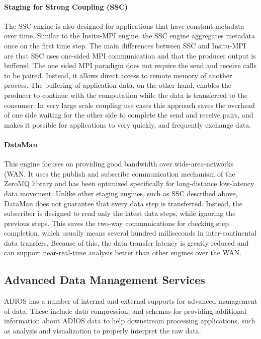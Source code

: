 \paragraph{\textbf{Staging for Strong Coupling (SSC)}}
The SSC engine is also designed for applications that have constant metadata over time. Similar to the Insitu-MPI engine, the SSC engine aggregates metadata once on the first time step. The main differences between SSC and Insitu-MPI are that SSC uses one-sided MPI communication and that the producer output is buffered.
The one sided MPI paradigm does not require the send and receive calls to be paired. Instead, it allows direct access to remote memory of another process. The buffering of application data, on the other hand, enables the producer to continue with the computation while the data is transferred to the consumer. 
In very large scale coupling use cases this approach saves the overhead of one side waiting for the other side to complete the send and receive pairs, and makes it possible for applications to very quickly, and frequently exchange data. 


\paragraph{\textbf{DataMan}}
This engine focuses on providing good bandwidth over wide-area-networks (WAN. It uses the publish and subscribe communication mechanism of the ZeroMQ library and has been optimized specifically for long-distance low-latency data movement. Unlike other staging engines, such as SSC described above, DataMan does not guarantee that every data step is transferred. Instead, the subscriber is designed to read only the latest data steps, while ignoring the previous steps. This saves the two-way communications for checking step completion, which usually means several hundred milliseconds in inter-continental data transfers. Because of this, the data transfer latency is greatly reduced and can support near-real-time analysis better than other engines over the WAN.

\subsection{Advanced Data Management Services}
\label{sec:adios:advanced}
ADIOS has a number of internal and external supports for advanced management of data. These include data compression, and schemas for providing additional information about ADIOS data to help downstream processing applications, such as analysis and visualization to properly interpret the raw data.

